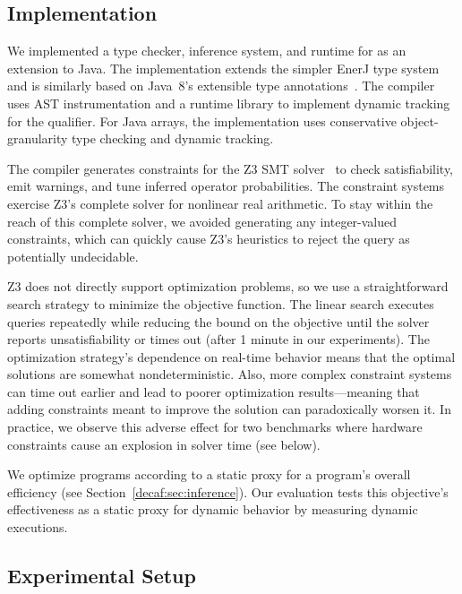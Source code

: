 {\subsection{Implementation}

We implemented a type checker, inference system, and runtime for \lang as an
extension to Java.
The implementation extends the simpler EnerJ type system~\cite{enerj} and is
similarly based on Java~8's extensible type annotations~\cite{jsr308}.
The compiler uses AST instrumentation and a runtime library to implement
dynamic tracking for the \Dyn qualifier.
For Java arrays, the implementation uses conservative object-granularity type
checking and dynamic tracking.

The compiler generates constraints for the Z3 SMT solver~\cite{z3} to check
satisfiability, emit warnings, and tune inferred operator probabilities.
The constraint systems exercise Z3's complete
solver for nonlinear real arithmetic.
To stay within the reach of this complete solver, we avoided generating any
integer-valued constraints, which can quickly cause Z3's heuristics to reject
the query as potentially undecidable.

Z3 does not directly support optimization problems, so
we use a straightforward search strategy to
minimize the objective function.
The linear search executes queries repeatedly while reducing the bound on the
objective until the solver reports unsatisfiability or times out (after 1
minute in our experiments).
The optimization strategy's dependence on real-time behavior means that the
optimal solutions are somewhat nondeterministic.
Also, more complex constraint systems can time out earlier and lead to
poorer optimization results---meaning that adding constraints meant
to improve the solution can paradoxically worsen it.
In practice, we observe this adverse effect for two benchmarks where hardware
constraints cause an explosion in solver time (see below).

We optimize programs according to a static proxy for a program's overall
efficiency (see Section~\ref{decaf:sec:inference}).
Our evaluation tests this objective's effectiveness as a static proxy for
dynamic behavior by measuring dynamic executions.

\subsection{Experimental Setup}

}
